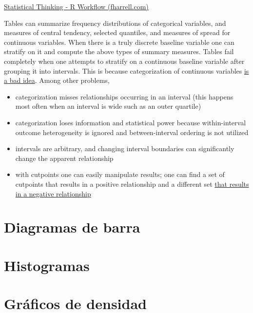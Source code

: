 \documentclass[
  letterpaper,
  DIV=11,
  numbers=noendperiod,
  oneside]{scrreprt}
\providecommand{\tightlist}{%
  \setlength{\itemsep}{0pt}\setlength{\parskip}{0pt}}\usepackage{longtable,booktabs,array}
\begin{document}
\href{https://www.fharrell.com/post/rflow/\#descriptive-statistics}{Statistical
Thinking - R Workflow (fharrell.com)}

Tables can summarize frequency distributions of categorical variables,
and measures of central tendency, selected quantiles, and measures of
spread for continuous variables. When there is a truly discrete baseline
variable one can stratify on it and compute the above types of summary
measures. Tables fail completely when one attempts to stratify on a
continuous baseline variable after grouping it into intervals. This is
because categorization of continuous variables
\href{https://discourse.datamethods.org/t/categorizing-continuous-variables}{is
a bad idea}. Among other problems,

\begin{itemize}
\tightlist
\item
  categorization misses relationships occurring in an interval (this
  happens most often when an interval is wide such as an outer quartile)
\item
  categorization loses information and statistical power because
  within-interval outcome heterogeneity is ignored and between-interval
  ordering is not utilized
\item
  intervals are arbitrary, and changing interval boundaries can
  significantly change the apparent relationship
\item
  with cutpoints one can easily manipulate results; one can find a set
  of cutpoints that results in a positive relationship and a different
  set
  \href{https://www.tandfonline.com/doi/abs/10.1080/09332480.2006.10722771}{that
  results in a negative relationship}
\end{itemize}

\hypertarget{diagramas-de-barra}{%
\section{Diagramas de barra}\label{diagramas-de-barra}}

\hypertarget{histogramas}{%
\section{Histogramas}\label{histogramas}}

\hypertarget{gruxe1ficos-de-densidad}{%
\section{Gráficos de densidad}\label{gruxe1ficos-de-densidad}}
\end{document}
